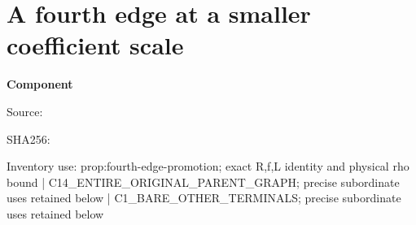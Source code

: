 \chapter{A fourth edge at a smaller coefficient scale}
\label{component:p4e9ae18b7af4}
\noindent\textbf{Component }\par
{\small\noindent Source: \par}
{\small\noindent SHA256: \par}
{\small\noindent Inventory use: prop:fourth-edge-promotion; exact R,f,L identity and physical rho bound | C14\_\allowbreak{}ENTIRE\_\allowbreak{}ORIGINAL\_\allowbreak{}PARENT\_\allowbreak{}GRAPH; precise subordinate uses retained below | C1\_\allowbreak{}BARE\_\allowbreak{}OTHER\_\allowbreak{}TERMINALS; precise subordinate uses retained below\par}
\medskip
